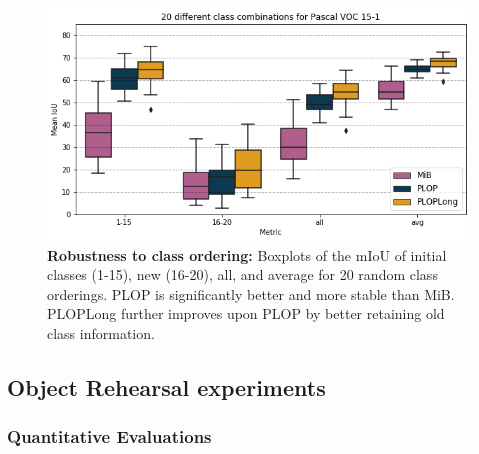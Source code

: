 


\begin{figure}
    \includegraphics[width=\linewidth]{images/seg/order_voc_15-1.png}
    \vspace*{-0.3cm}
    \caption{\textbf{Robustness to class ordering:} Boxplots of the \ac{mIoU} of initial classes (1-15), new (16-20), all, and average for
        20 random class orderings. PLOP is significantly better and more stable than MiB. PLOPLong
        further improves upon PLOP by better retaining old class information.}
    \label{fig:seg_order_voc_15-1}
\end{figure}


\subsection{Object Rehearsal experiments}

\subsubsection{Quantitative Evaluations}



